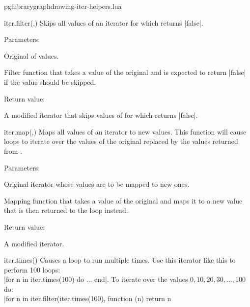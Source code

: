 
\begin{filedescription}{pgflibrarygraphdrawing-iter-helpers.lua}


\begin{luacommand}{{iter.filter}(,)}
Skips all values of an iterator for which  returns |false|. 

Parameters:
\begin{parameterdescription}
	\item[\meta{iterator}] Original  of values.\item[\meta{filter\_func}] Filter function that takes a value of the original  and is expected to return |false| if the value should be skipped. 
\end{parameterdescription}


Return value:
\begin{parameterdescription} 
  \item[] A modified iterator that skips values of  for which  returns |false|. 
\end{parameterdescription}


\end{luacommand}
\begin{luacommand}{{iter.map}(,)}
Maps all values of an iterator to new values.  This function will cause loops to iterate over the values of the original  replaced by the values returned from . 

Parameters:
\begin{parameterdescription}
	\item[\meta{iterator}] Original iterator whose values are to be mapped to new ones.\item[\meta{map\_func}] Mapping function that takes a value of the original  and maps it to a new value that is then returned to the loop instead. 
\end{parameterdescription}


Return value:
\begin{parameterdescription} 
  \item[] A modified iterator. 
\end{parameterdescription}


\end{luacommand}
\begin{luacommand}{{iter.times}()}
Causes a loop to run multiple times.  Use this iterator like this to perform 100 loops:\\ |for n in iter.times(100) do ... end|.  To iterate over the values $0, 10, 20, 30, ..., 100$ do:\\ |for n in iter.filter(iter.times(100), function (n) return n %


\end{luacommand}
\end{filedescription}
